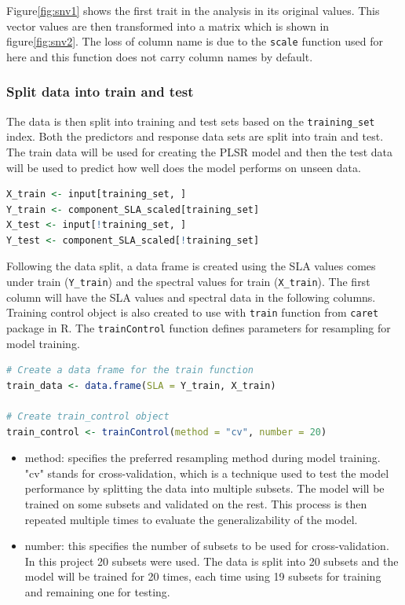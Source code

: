 \documentclass[12pt,a4paper]{report}
\begin{document}
Figure\ref{fig:snv1} shows the first trait in the analysis in its original values. This vector values are then transformed into a matrix which is shown in figure\ref{fig:snv2}. The loss of column name is due to the \texttt{scale} function used for here and this function does not carry column names by default. \\

\subsubsection*{Split data into train and test}
The data is then split into training and test sets based on the \texttt{training\_set} index. Both the predictors and response data sets are split into train and test. The train data will be used for creating the PLSR model and then the test data will be used to predict how well does the model performs on unseen data. \\

\begin{lstlisting}[language=R, style=mystyle]
X_train <- input[training_set, ]
Y_train <- component_SLA_scaled[training_set]
X_test <- input[!training_set, ]
Y_test <- component_SLA_scaled[!training_set]
\end{lstlisting}

Following the data split, a data frame is created using the SLA values comes under train (\texttt{Y\_train}) and the spectral values for train (\texttt{X\_train}). The first column will have the SLA values and spectral data in the following columns. Training control object is also created to use with \texttt{train} function from \texttt{caret} package in R. The \texttt{trainControl} function defines parameters for resampling for model training. \\

\begin{lstlisting}[language=R, style=mystyle]
# Create a data frame for the train function
train_data <- data.frame(SLA = Y_train, X_train)

# Create train_control object
train_control <- trainControl(method = "cv", number = 20)
\end{lstlisting}

\begin{itemize}
    \item method: specifies the preferred resampling method during model training. "cv" stands for cross-validation, which is a technique used to test the model performance by splitting the data into multiple subsets. The model will be trained on some subsets and validated on the rest. This process is then repeated multiple times to evaluate the generalizability of the model.
    \item number: this specifies the number of subsets to be used for cross-validation. In this project 20 subsets were used. The data is split into 20 subsets and the model will be trained for 20 times, each time using 19 subsets for training and remaining one for testing. 
\end{itemize}
\end{document}
